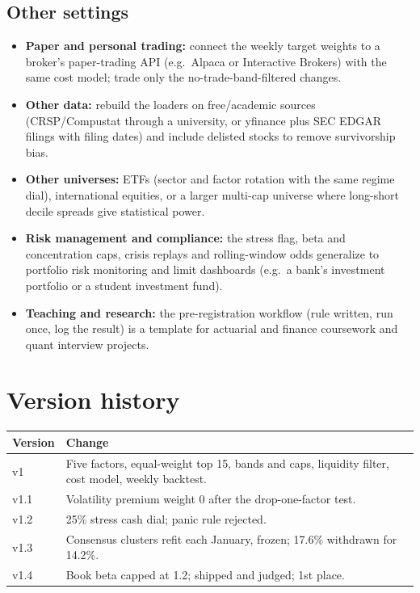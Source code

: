 \documentclass[11pt]{article}
\begin{document}
\subsection{Other settings}
\begin{itemize}
\item \textbf{Paper and personal trading:} connect the weekly target weights to a broker's paper-trading API (e.g.\ Alpaca or Interactive Brokers) with the same cost model; trade only the no-trade-band-filtered changes.
\item \textbf{Other data:} rebuild the loaders on free/academic sources (CRSP/Compustat through a university, or yfinance plus SEC EDGAR filings with filing dates) and include delisted stocks to remove survivorship bias.
\item \textbf{Other universes:} ETFs (sector and factor rotation with the same regime dial), international equities, or a larger multi-cap universe where long-short decile spreads give statistical power.
\item \textbf{Risk management and compliance:} the stress flag, beta and concentration caps, crisis replays and rolling-window odds generalize to portfolio risk monitoring and limit dashboards (e.g.\ a bank's investment portfolio or a student investment fund).
\item \textbf{Teaching and research:} the pre-registration workflow (rule written, run once, log the result) is a template for actuarial and finance coursework and quant interview projects.
\end{itemize}

\appendix
\section{Version history}
\begin{table}[H]\centering\small
\begin{tabularx}{\textwidth}{lL}
\toprule
Version & Change \\
\midrule
v1 & Five factors, equal-weight top 15, bands and caps, liquidity filter, cost model, weekly backtest. \\
v1.1 & Volatility premium weight 0 after the drop-one-factor test. \\
v1.2 & 25\% stress cash dial; panic rule rejected. \\
v1.3 & Consensus clusters refit each January, frozen; 17.6\% withdrawn for 14.2\%. \\
v1.4 & Book beta capped at 1.2; shipped and judged; 1st place. \\
\bottomrule
\end{tabularx}
\end{table}
\end{document}
